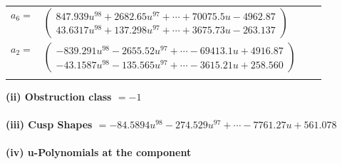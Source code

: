 \documentclass[1p]{elsarticle_modified}
\theoremstyle{definition}
\begin{document}
\begin{tabular}{m{7pt} m{180pt} m{7pt} m{180pt} }
\flushright $a_{6}=$&$\begin{pmatrix}847.939 u^{98}+2682.65 u^{97}+\cdots+70075.5 u-4962.87\\43.6317 u^{98}+137.298 u^{97}+\cdots+3675.73 u-263.137\end{pmatrix}$ \\
\flushright $a_{2}=$&$\begin{pmatrix}-839.291 u^{98}-2655.52 u^{97}+\cdots-69413.1 u+4916.87\\-43.1587 u^{98}-135.565 u^{97}+\cdots-3615.21 u+258.560\end{pmatrix}$\\&\end{tabular}
\flushleft \textbf{(ii) Obstruction class $= -1$}\\~\\
\flushleft \textbf{(iii) Cusp Shapes $= -84.5894 u^{98}-274.529 u^{97}+\cdots-7761.27 u+561.078$}\\~\\
\newpage\renewcommand{\arraystretch}{1}
\flushleft \textbf{(iv) u-Polynomials at the component}\newline \\
\end{document}
